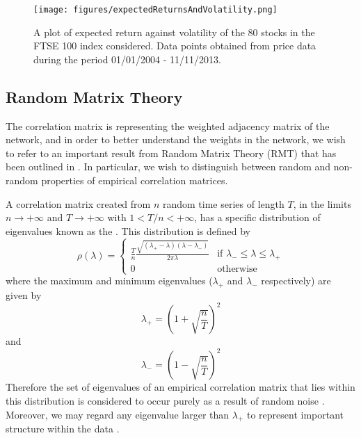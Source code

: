 \begin{figure}
	\centering
	\texttt{[image: figures/expectedReturnsAndVolatility.png]}
	\caption[Plot of expected return against volatility for 80 FTSE 100 stocks.]{\label{fig:expectedReturnsAndVolatility} A plot of expected return against volatility of the 80 stocks in the FTSE 100 index considered. Data points obtained from price data during the period 01/01/2004 - 11/11/2013.}
\end{figure}


\subsection{Random Matrix Theory}
\label{subsec:randomMatrixTheory}

The correlation matrix is representing the weighted adjacency matrix of the network, and in order to better understand the weights in the network, we wish to refer to an important result from Random Matrix Theory (RMT) that has been outlined in \cite{SM99,PGR+99,PBL05,MG13}.
In particular, we wish to distinguish between random and non-random properties of empirical correlation matrices.

A correlation matrix created from $n$ random time series of length $T$, in the limits $n \rightarrow +\infty$ and $T \rightarrow +\infty$ with $1 < T/n < +\infty$, has a specific distribution of eigenvalues known as the  \cite{SM99,PBL05,FPW+11,MG13}. This distribution is defined by 
\begin{equation}
	\label{def:senguptaMitraDistribution}
	\rho(\lambda) =	
	\begin{cases}
		\frac{T}{n}\frac{\sqrt{(\lambda_{+} - \lambda)(\lambda - \lambda_{-})}}{2\pi\lambda}& \text{if } \lambda_{-} \leq \lambda \leq \lambda_{+} \\
		0 & \text{otherwise}
	\end{cases}
\end{equation}
where the maximum and minimum eigenvalues ($\lambda_{+}$ and $\lambda_{-}$ respectively) are given by
\begin{equation}
\label{eq:maxEigenvalueSM}
	\lambda_{+} = \left(1+\sqrt{\frac{n}{T}}\right)^{2}
\end{equation}
and
\begin{equation}
\label{eq:minEigenvalueSM}
	\lambda_{-} = \left(1-\sqrt{\frac{n}{T}}\right)^{2}
\end{equation}
Therefore the set of eigenvalues of an empirical correlation matrix that lies within this distribution is considered to occur purely as a result of random noise \cite{PBL05,FPW+11,MG13}. Moreover, we may regard any eigenvalue larger than $\lambda_{+}$ to represent important structure within the data \cite{PBL05,FPW+11,MG13}.

